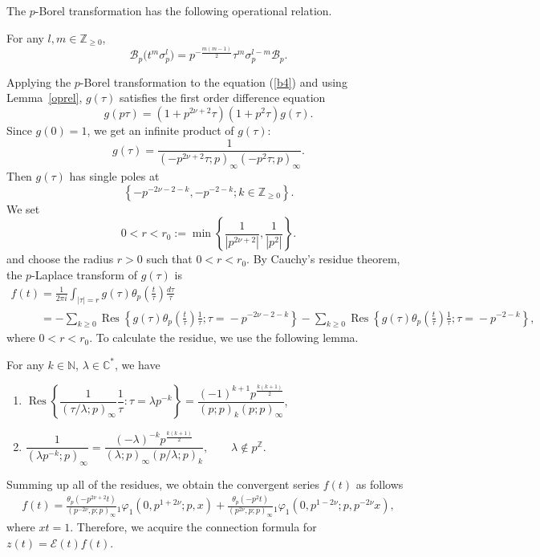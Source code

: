 \documentclass[pdftex]{sigma}
\newcommand{\res}{\operatorname{Res}}
\begin{document}
The $p$-Borel transformation has the following operational relation.
\begin{lemma}\label{oprel}For any $l,m \in \mathbb{Z}_{\ge 0}$,
\[
\mathcal{B}_p\big(t^m\sigma_p^l\big)=p^{-\frac{m(m-1)}{2}}\tau^m\sigma_p^{l-m}\mathcal{B}_p.
\]
\end{lemma}
Applying the $p$-Borel transformation to the equation (\ref{b4}) and using Lemma~\ref{oprel}, $g(\tau )$ satisf\/ies the f\/irst order dif\/ference equation
\[
g(p\tau )=\left(1+p^{2\nu +2}\tau \right)\left(1+p^2\tau \right)g(\tau ).
\]
Since $g(0)=1$, we get an inf\/inite product of $g(\tau )$:
\[
g(\tau )=\frac{1}{(-p^{2\nu +2}\tau ;p)_\infty(-p^2\tau ;p)_\infty}.
\]
Then $g(\tau )$ has single poles at
\[
\left\{-p^{-2\nu -2-k},-p^{-2-k};k\in\mathbb{Z}_{\ge 0}\right\}.
\]
We set
\[0<r<r_0:=\min\left\{\frac{1}{|p^{2\nu +2}|},  \frac{1}{|p^2|}\right\}.\]
and choose the radius $r>0$ such that $0<r<r_0$.
By Cauchy's residue theorem, the $p$-Laplace transform of $g(\tau )$ is
\begin{gather*}
f(t)= \frac{1}{2\pi i}\int_{|\tau |=r}g(\tau )\theta_p\left(\frac{t}{\tau}\right)\frac{d\tau}{\tau }\\
\phantom{f(t)}{}
= -\sum_{k\ge 0}\res\left\{g(\tau )\theta_p\!\left(\frac{t}{\tau}\right)\!\frac{1}{\tau };\tau \!=\!-p^{-2\nu-2-k}\right\}\!
 -\sum_{k\ge 0}\res\left\{g(\tau )\theta_p\!\left(\frac{t}{\tau}\right)\!\frac{1}{\tau };\tau \!=\! -p^{-2-k}\right\},
\end{gather*}
where $0<r<r_0$. To calculate the residue, we use the following lemma.
\begin{lemma}\label{lems}For any $k\in\mathbb{N}$, $\lambda\in\mathbb{C}^*$, we have
\begin{enumerate}\itemsep=0pt
\item[$1.$] $\res\left\{\dfrac{1}{\left(\tau /\lambda ;p\right)_\infty}\dfrac{1}{\tau }:\tau =\lambda p^{-k}\right\}
=\dfrac{(-1)^{k+1}p^{\frac{k(k+1)}{2}}}{(p;p)_k (p;p)_\infty}$,
\item[$2.$] $\dfrac{1}{(\lambda p^{-k};p)_\infty}=\dfrac{(-\lambda )^{-k}p^{\frac{k(k+1)}{2}}}{(\lambda ;p)_\infty \left(p/\lambda ;p\right)_k},\qquad \lambda \not \in p^{\mathbb{Z}}$.
\end{enumerate}
\end{lemma}

Summing up all of the residues, we obtain the convergent series $f(t)$ as follows
\begin{gather*}
f(t) =\frac{\theta
_p\left(-p^{2\nu +2}t\right)}{(p^{-2\nu},p;p)_\infty}
{}_1\varphi_1\left(0,p^{1+2\nu};p,x\right)
 +\frac{\theta _p\left(-p^2t\right)}{(p^{2\nu},p;p)_\infty}
{}_1\varphi_1\left(0,p^{1-2\nu};p,p^{-2\nu}x\right),
\end{gather*}
where $xt=1$.
Therefore, we acquire the connection formula for $z(t)=\mathcal{E}(t)f(t)$.
\end{document}
